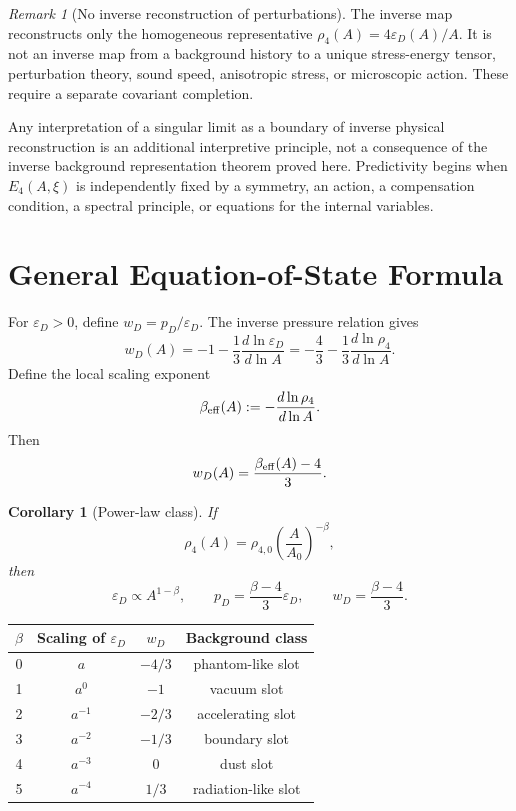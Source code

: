 \documentclass[11pt,a4paper]{article}
\def\dd{d}%
\numberwithin{equation}{section}
\newtheorem{corollary}[criterion]{Corollary}
\theoremstyle{remark}
\newtheorem{remark}[criterion]{Remark}
\newcommand{\Efour}{E_4}
\newcommand{\rhoFour}{\rho_4}
\newcommand{\epsD}{\varepsilon_D}
\newcommand{\pD}{p_D}
\newcommand{\dd}{\mathrm{d}}
\begin{document}
\begin{remark}[No inverse reconstruction of perturbations]
The inverse map reconstructs only the homogeneous representative \(\rhoFour(A)=4\epsD(A)/A\). It is not an inverse map from a background history to a unique stress-energy tensor, perturbation theory, sound speed, anisotropic stress, or microscopic action. These require a separate covariant completion.
\end{remark}

Any interpretation of a singular limit as a boundary of inverse physical reconstruction is an additional interpretive principle, not a consequence of the inverse background representation theorem proved here. Predictivity begins when \(\Efour(A,\xi)\) is independently fixed by a symmetry, an action, a compensation condition, a spectral principle, or equations for the internal variables.

\section{General Equation-of-State Formula}
For \(\epsD>0\), define \(w_D=\pD/\epsD\). The inverse pressure relation gives
\begin{equation}
w_D(A)=-1-\frac{1}{3}\frac{\dd\ln\epsD}{\dd\ln A}
=-\frac{4}{3}-\frac{1}{3}\frac{\dd\ln\rhoFour}{\dd\ln A}.
\end{equation}
Define the local scaling exponent
\begin{equation}
\beta_{\rm eff}(A):=-\frac{\dd\ln\rhoFour}{\dd\ln A}.
\end{equation}
Then
\begin{equation}
w_D(A)=\frac{\beta_{\rm eff}(A)-4}{3}.
\end{equation}

\begin{corollary}[Power-law class]
If
\begin{equation}
\rhoFour(A)=\rho_{4,0}\left(\frac{A}{A_0}\right)^{-\beta},
\end{equation}
then
\begin{equation}
\epsD\propto A^{1-\beta},
\qquad
\pD=\frac{\beta-4}{3}\epsD,
\qquad
w_D=\frac{\beta-4}{3}.
\end{equation}
\end{corollary}

\begin{center}
\begin{tabular}{@{}cccc@{}}
\toprule
\(\beta\) & Scaling of \(\epsD\) & \(w_D\) & Background class \\
\midrule
0 & \(a\)      & \(-4/3\) & phantom-like slot \\
1 & \(a^0\)    & \(-1\)   & vacuum slot \\
2 & \(a^{-1}\) & \(-2/3\) & accelerating slot \\
3 & \(a^{-2}\) & \(-1/3\) & boundary slot \\
4 & \(a^{-3}\) & \(0\)    & dust slot \\
5 & \(a^{-4}\) & \(1/3\)  & radiation-like slot \\
\bottomrule
\end{tabular}
\end{center}
\end{document}
